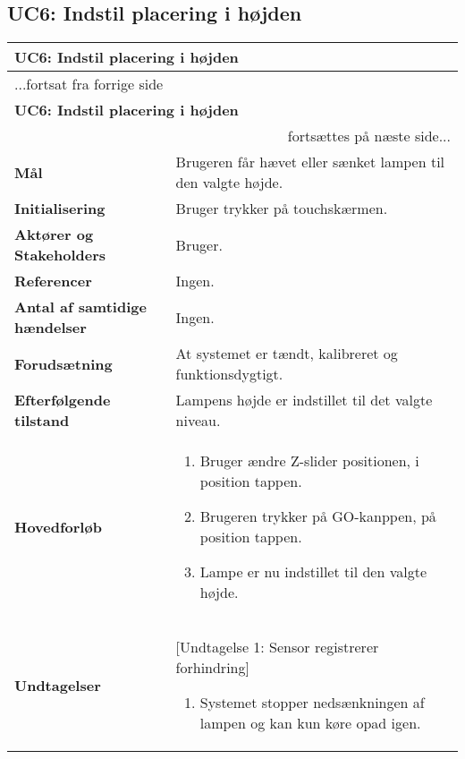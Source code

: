 \subsection{UC6: Indstil placering i højden}

\begin{center} \centering
	\begin{longtable}{|p{6cm}|p{8cm}|}
	\hline
		\multicolumn{2}{|l|}{\textbf{UC6: Indstil placering i højden}} \\\hline
		\endfirsthead
		
		\multicolumn{2}{l}{...fortsat fra forrige side} \\ \hline 
		\multicolumn{2}{|l|}{\textbf{UC6: Indstil placering i højden}} \\\hline
		\endhead		

        \multicolumn{2}{r}{fortsættes på næste side...} \\
        \endfoot
        \endlastfoot
        
        \textbf{Mål}								
            & Brugeren får hævet eller sænket lampen til den valgte højde.
        \\ \hline
        \textbf{Initialisering}					
            & Bruger trykker på touchskærmen.
        \\ \hline
        \textbf{Aktører og Stakeholders}			
            & Bruger.
        \\ \hline
        \textbf{Referencer}						
            & Ingen.
        \\ \hline
        \textbf{Antal af samtidige hændelser}	
            & Ingen.
        \\ \hline
        \textbf{Forudsætning}					
            & At systemet er tændt, kalibreret og funktionsdygtigt.
        \\ \hline		
        \textbf{Efterfølgende tilstand}	
            & Lampens højde er indstillet til det valgte niveau.
        \\ \hline
        \textbf{Hovedforløb}						
            &
            \begin{enumerate}
                \item Bruger ændre Z-slider positionen, i position tappen.
                \item Brugeren trykker på GO-kanppen, på position tappen. 
                \item Lampe er nu indstillet til den valgte højde.
            \end{enumerate}
        \\ \hline
        \textbf{Undtagelser}						
            & [Undtagelse 1: Sensor registrerer forhindring]
            \begin{enumerate}
                \item Systemet stopper nedsænkningen af lampen og kan kun køre opad igen.
            \end{enumerate}
        \\ \hline
	\end{longtable}
	\label{UC7} 
\end{center}